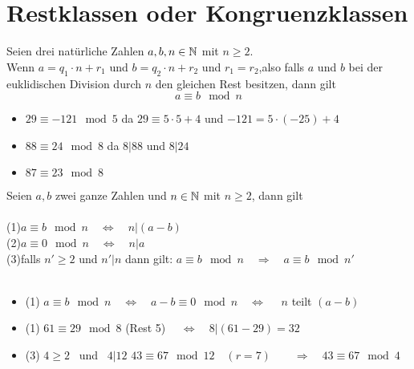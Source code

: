 	\section{Restklassen oder Kongruenzklassen}

\begin{Definition}
Seien drei natürliche Zahlen $a, b, n \in \mathbb{N}$ mit $n\geq 2$.\\ Wenn $a=q_{1} \cdot n + r_{1}$  \qquad und \qquad  $b=q_{2} \cdot n + r_{2}$ \qquad und \quad $r_{1}=r_{2}$,\qquad also falls $a$ und $b$ bei der euklidischen Division durch $n$ den gleichen Rest besitzen, dann gilt
$$a \equiv b\mod n$$
\end{Definition}

\begin{Beispiel}
\begin{itemize}
\item $29\equiv-121 \mod 5 $ \quad da $29 \equiv 5\cdot 5 +4$ \quad und \quad $-121 = 5\cdot (-25) +4$
\item $88\equiv 24 \mod 8 $ \quad da $8|88$ \quad und \quad $8|24$
\item $87\equiv 23 \mod 8$ \\
\end{itemize}
\end{Beispiel}

\begin{Theorem}
Seien $a,b$ zwei ganze Zahlen und $n\in\mathbb{N}$ mit $n\geq 2$, dann gilt\\\\
(1)\qquad $ a\equiv b \mod n \quad \Leftrightarrow \quad n|(a-b)$\\
(2)\qquad $ a\equiv 0 \mod n \quad\Leftrightarrow\quad n|a$\\
(3)\qquad falls $n'\geq 2$ und $n'|n$ dann gilt: \quad $a \equiv b \mod n \quad \Rightarrow \quad a \equiv b \mod n' $\\\\
\end{Theorem}

\begin{Beweis}
\begin{itemize}
\item (1) \quad $ a \equiv b \mod n \quad\Leftrightarrow\quad a - b \equiv 0 \mod n \quad\Leftrightarrow\quad $ $n$ teilt $(a-b)$
\end{itemize}
\end{Beweis}

\begin{Beispiel}
\begin{itemize}
\item (1) \quad $61 \equiv 29 \mod 8$ \quad (Rest 5) $\quad\Leftrightarrow\quad 8| (61-29) = 32 $
\item (3) \quad $4 \geq 2$ \, und \, $4|12$ \quad $43 \equiv 67 \mod 12 \quad(r=7)\qquad \Rightarrow \quad 43 \equiv 67 \mod 4  $ \\
\end{itemize}
\end{Beispiel}


